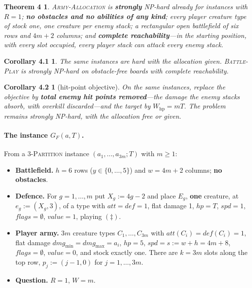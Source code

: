 \documentclass[11pt,a4paper]{article}
\theoremstyle{plain}
\newtheorem*{thmfour}{Theorem 4}
\newtheorem*{corfourone}{Corollary 4.1}
\newtheorem*{corfourtwo}{Corollary 4.2}
\theoremstyle{definition}
\theoremstyle{plain}
\theoremstyle{definition}
\theoremstyle{remark}
\newcommand{\ALLOC}{\textsc{Army-Allocation}}
\newcommand{\PLAY}{\textsc{Battle-Play}}
\newcommand{\THREEPART}{\textsc{3-Partition}}
\begin{document}
\begin{thmfour}
\ALLOC{} is \textbf{strongly} NP-hard already for instances with $R=1$; \textbf{no obstacles
and no abilities of any kind}; every player creature type of stock one, one creature per enemy
stack; a rectangular open battlefield of six rows and $4m+2$ columns; and \textbf{complete
reachability}---in the starting position, with every slot occupied, every player stack can
attack every enemy stack.
\end{thmfour}

\begin{corfourone}
The same instances are hard with the allocation \emph{given}. \PLAY{} is strongly NP-hard on
obstacle-free boards with complete reachability.
\end{corfourone}

\begin{corfourtwo}[hit-point objective]
On the same instances, replace the objective by \textbf{total enemy hit points removed}---the
damage the enemy stacks absorb, with overkill discarded---and the target by
$W_{\mathrm{hp}}=mT$. The problem remains strongly NP-hard, with the allocation free or given.
\end{corfourtwo}

\paragraph{The instance $G_F(a,T)$.} From a \THREEPART{} instance $(a_1,\dots,a_{3m};T)$ with
$m\ge 1$:

\begin{itemize}
\item \textbf{Battlefield.} $h=6$ rows ($y\in\{0,\dots,5\}$) and $w=4m+2$ columns;
  \textbf{no obstacles}.
\item \textbf{Defence.} For $g=1,\dots,m$ put $X_g:=4g-2$ and place $E_g$, \textbf{one}
  creature, at $e_g:=(X_g,3)$, of a type with $\mathit{att}=\mathit{def}=1$, flat damage 1,
  $\mathit{hp}=T$, $\mathit{spd}=1$, $\mathit{flags}=\emptyset$, $\mathit{value}=1$, playing
  $(\ddagger)$.
\item \textbf{Player army.} $3m$ creature types $C_1,\dots,C_{3m}$ with
  $\mathit{att}(C_i)=\mathit{def}(C_i)=1$, flat damage
  $\mathit{dmg}_{\min}=\mathit{dmg}_{\max}=a_i$, $\mathit{hp}=5$,
  $\mathit{spd}=s:=w+h=4m+8$, $\mathit{flags}=\emptyset$, $\mathit{value}=0$, and stock
  exactly one. There are $k=3m$ slots along the top row, $p_j:=(j-1,0)$ for $j=1,\dots,3m$.
\item \textbf{Question.} $R=1$, $W=m$.
\end{itemize}
\end{document}
